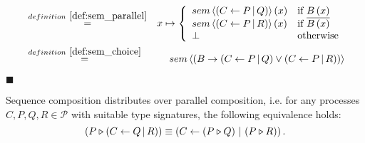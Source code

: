 \begin{myproof}
\begin{eqnarray*}
  & \overset{\defref{def:sem_parallel}}{=} & x \mapsto \left\{\begin{array}{ll}
                                                      \sem{\parallel{C}{P}{Q}} \left( x \right) & \text{if } B \left( x \right) \\
                                                      \sem{\parallel{C}{P}{R}} \left( x \right) & \text{if } \overline{B \left( x \right)} \\
                                                      \bot & \text{otherwise}
                                                    \end{array}
                                             \right. \\
  & \overset{\defref{def:sem_choice}}{=}   & \sem{\choice{B}{\parallel{C}{P}{Q}}{\parallel{C}{P}{R}}}
\end{eqnarray*}

\hfill$\blacksquare$
\end{myproof}


\begin{theorem}
\label{thm:distributivity_sequence_parallel}
Sequence composition distributes over parallel composition, i.e. for any processes $C, P, Q, R \in \mathcal{P}$ with suitable type signatures, the following equivalence holds:
\begin{equation*}
  \left( P \triangleright \left( C \gets Q \, | \, R \right) \right) \equiv \left( C \gets \left( P \triangleright Q \right) \, | \, \left( P \triangleright R \right) \right).
\end{equation*}
\end{theorem}

